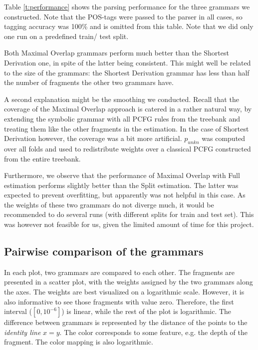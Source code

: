 Table \ref{t:performance} shows the parsing performance for the three grammars we constructed. Note that the POS-tags were passed to the parser in all cases, so tagging accuracy was 100\% and is omitted from this table. 
Note that we did only one run on a predefined train/ test split.

Both Maximal Overlap grammars perform much better than the Shortest Derivation one, in spite of the latter being consistent. 
This might well be related to the size of the grammars: the Shortest Derivation grammar has less than half the number of fragments the other two grammars have. 

A second explanation might be the smoothing we conducted. Recall that the coverage of the Maximal Overlap approach is catered in a rather natural way, by extending the symbolic grammar with all PCFG rules from the treebank and treating them like the other fragments in the estimation. In the case of Shortest Derivation however, the coverage was a bit more artificial. $p_{unkn}$ was computed over all folds and used to redistribute weights over a classical PCFG constructed from the entire treebank. 


Furthermore, we observe that the performance of Maximal Overlap with Full estimation performs slightly better than the Split estimation. The latter was expected to prevent overfitting, but apparently was not helpful in this case. As the weights of these two grammars do not diverge much, it would be recommended to do several runs (with different splits for train and test set). This was however not feasible for us, given the limited amount of time for this project.


\subsection{Pairwise comparison of the grammars}
In each plot, two grammars are compared to each other. The fragments are presented in a scatter plot, with the weights assigned by the two grammars along the axes. The weights are best visualized on a logarithmic scale. However, it is also informative to see those fragments with value zero. Therefore, the first interval ($[0,10^{-6}]$) is linear, while the rest of the plot is logarithmic. 
The difference between grammars is represented by the distance of the points to the \emph{identity line} $x=y$.
The color corresponds to some feature, e.g. the depth of the fragment. The color mapping is also logarithmic. 

